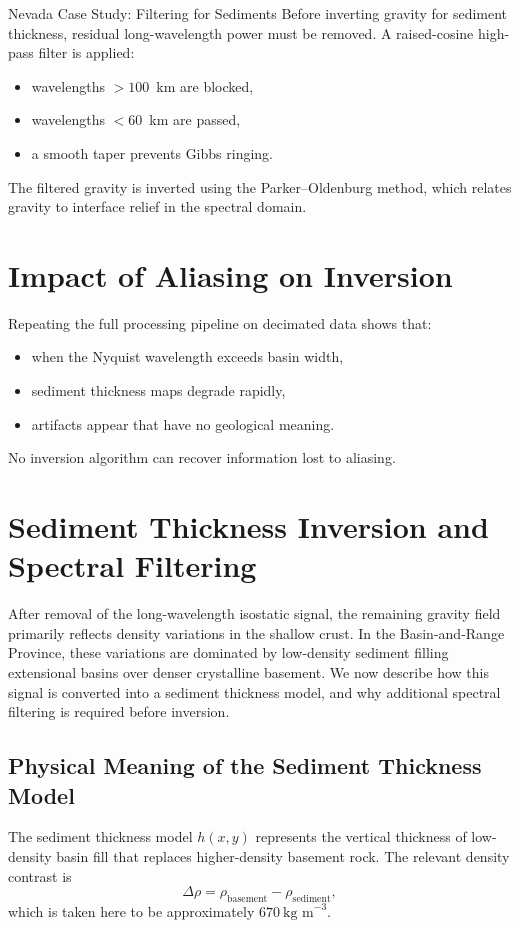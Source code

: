 \begin{activity}{Nevada Case Study: Filtering for Sediments}
Before inverting gravity for sediment thickness,
residual long-wavelength power must be removed.
A raised-cosine high-pass filter is applied:
\begin{itemize}
  \item wavelengths $> 100$~km are blocked,
  \item wavelengths $< 60$~km are passed,
  \item a smooth taper prevents Gibbs ringing.
\end{itemize}

The filtered gravity is inverted using the Parker--Oldenburg method,
which relates gravity to interface relief in the spectral domain.

\section*{Impact of Aliasing on Inversion}

Repeating the full processing pipeline on decimated data shows that:
\begin{itemize}
  \item when the Nyquist wavelength exceeds basin width,
  \item sediment thickness maps degrade rapidly,
  \item artifacts appear that have no geological meaning.
\end{itemize}

No inversion algorithm can recover information lost to aliasing.

\section*{Sediment Thickness Inversion and Spectral Filtering}

After removal of the long-wavelength isostatic signal, the remaining gravity field
primarily reflects density variations in the shallow crust.
In the Basin-and-Range Province, these variations are dominated by
low-density sediment filling extensional basins over denser crystalline basement.
We now describe how this signal is converted into a sediment thickness model,
and why additional spectral filtering is required before inversion.

\subsection*{Physical Meaning of the Sediment Thickness Model}

The sediment thickness model $h(x,y)$ represents the vertical thickness of
low-density basin fill that replaces higher-density basement rock.
The relevant density contrast is
\begin{equation}
\Delta\rho = \rho_{\text{basement}} - \rho_{\text{sediment}},
\end{equation}
which is taken here to be approximately $670~\text{kg m}^{-3}$.


\end{activity}
